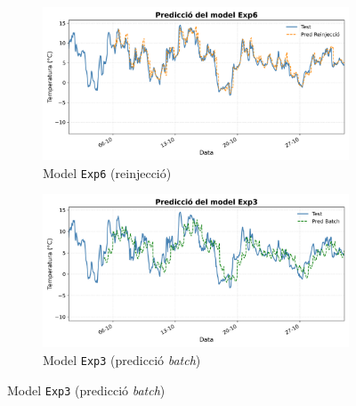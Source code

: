 \documentclass[../main.tex]{subfiles}
\begin{document}
\begin{figure}[H]
    \centering

    \begin{subfigure}[b]{0.48\textwidth}
        \centering
        \includegraphics[width=\textwidth]{figures/lstm/results/Exp6_plot_def.png}
        \caption{Model \texttt{Exp6} (reinjecció)}
        \label{fig:exp6}
    \end{subfigure}
    \hfill
    \begin{subfigure}[b]{0.48\textwidth}
        \centering
        \includegraphics[width=\textwidth]{figures/lstm/results/Exp3_plot_def.png}
        \caption{Model \texttt{Exp3} (predicció \textit{batch})}
        \label{fig:exp3}
    \end{subfigure}

    \vspace{0.5cm}


\end{figure}
\end{document}
